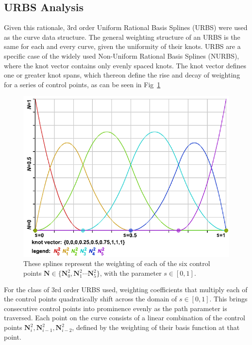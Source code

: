 \subsection{URBS Analysis}
Given this rationale, 3rd order Uniform Rational Basis Splines (URBS) were used as the curve data structure. The general weighting structure of an URBS is the same for each and every curve, given the uniformity of their knots. URBS are a specific case of the widely used Non-Uniform Rational Basis Splines (NURBS), where the knot vector contains only evenly spaced knots. The knot vector defines one or greater knot spans, which thereon define the rise and decay of weighting for a series of control points, as can be seen in Fig~\ref{fig:nurbsBasis} 

\begin{figure}  
\includegraphics[width=\textwidth]{figures/optimisation/nurbsBasis.png}
\caption[3rd order (Quadratic) URBS basis splines]{ These splines represent the weighting of each of the six control points $\textbf{N} \in \{\textbf{N}_0^2, \textbf{N}_1^2 \cdots \textbf{N}_5^2\}$, with the parameter $s \in [0, 1].$ \cite{website:nurbsDemo}  
\label{fig:nurbsBasis}}
\end{figure}

For the class of 3rd order URBS used, weighting coefficients that multiply each of the control points quadratically shift across the domain of $s \in [0, 1]$. This brings consecutive control points into prominence evenly as the path parameter is traversed. Each point on the curve consists of a linear combination of the control points $\textbf{N}_i^2, \textbf{N}_{i-1}^2, \textbf{N}_{i-2}^2$, defined by the weighting of their basis function at that point.

